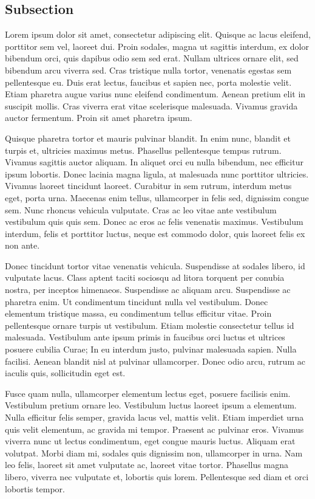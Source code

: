 \subsection{Subsection}



Lorem ipsum dolor sit amet, consectetur adipiscing elit. Quisque ac lacus eleifend, porttitor sem vel, laoreet dui. Proin sodales, magna ut sagittis interdum, ex dolor bibendum orci, quis dapibus odio sem sed erat. Nullam ultrices ornare elit, sed bibendum arcu viverra sed. Cras tristique nulla tortor, venenatis egestas sem pellentesque eu. Duis erat lectus, faucibus et sapien nec, porta molestie velit. Etiam pharetra augue varius nunc eleifend condimentum. Aenean pretium elit in suscipit mollis. Cras viverra erat vitae scelerisque malesuada. Vivamus gravida auctor fermentum. Proin sit amet pharetra ipsum.

Quisque pharetra tortor et mauris pulvinar blandit. In enim nunc, blandit et turpis et, ultricies maximus metus. Phasellus pellentesque tempus rutrum. Vivamus sagittis auctor aliquam. In aliquet orci eu nulla bibendum, nec efficitur ipsum lobortis. Donec lacinia magna ligula, at malesuada nunc porttitor ultricies. Vivamus laoreet tincidunt laoreet. Curabitur in sem rutrum, interdum metus eget, porta urna. Maecenas enim tellus, ullamcorper in felis sed, dignissim congue sem. Nunc rhoncus vehicula vulputate. Cras ac leo vitae ante vestibulum vestibulum quis quis sem. Donec ac eros ac felis venenatis maximus. Vestibulum interdum, felis et porttitor luctus, neque est commodo dolor, quis laoreet felis ex non ante.

Donec tincidunt tortor vitae venenatis vehicula. Suspendisse at sodales libero, id vulputate lacus. Class aptent taciti sociosqu ad litora torquent per conubia nostra, per inceptos himenaeos. Suspendisse ac aliquam arcu. Suspendisse ac pharetra enim. Ut condimentum tincidunt nulla vel vestibulum. Donec elementum tristique massa, eu condimentum tellus efficitur vitae. Proin pellentesque ornare turpis ut vestibulum. Etiam molestie consectetur tellus id malesuada. Vestibulum ante ipsum primis in faucibus orci luctus et ultrices posuere cubilia Curae; In eu interdum justo, pulvinar malesuada sapien. Nulla facilisi. Aenean blandit nisl at pulvinar ullamcorper. Donec odio arcu, rutrum ac iaculis quis, sollicitudin eget est.

Fusce quam nulla, ullamcorper elementum lectus eget, posuere facilisis enim. Vestibulum pretium ornare leo. Vestibulum luctus laoreet ipsum a elementum. Nulla efficitur felis semper, gravida lacus vel, mattis velit. Etiam imperdiet urna quis velit elementum, ac gravida mi tempor. Praesent ac pulvinar eros. Vivamus viverra nunc ut lectus condimentum, eget congue mauris luctus. Aliquam erat volutpat. Morbi diam mi, sodales quis dignissim non, ullamcorper in urna. Nam leo felis, laoreet sit amet vulputate ac, laoreet vitae tortor. Phasellus magna libero, viverra nec vulputate et, lobortis quis lorem. Pellentesque sed diam et orci lobortis tempor.

